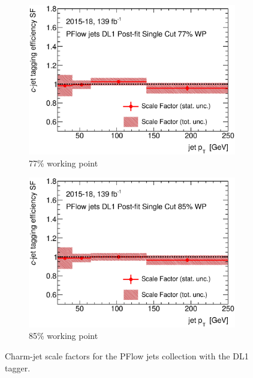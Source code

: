 \begin{figure}[H]
\begin{subfigure}[t]{.35\linewidth}
		\includegraphics[width=1\textwidth]{FTAG_plots/DL1allPFlowDec/SF77.eps}
		\caption{77\% working point}
		\end{subfigure}
		\begin{subfigure}[t]{.35\linewidth}
		\includegraphics[width=1\textwidth]{FTAG_plots/DL1allPFlowDec/SF85.eps}
		\caption{85\% working point}
		\end{subfigure}
	\caption{Charm-jet scale factors for the PFlow jets collection with 
	the DL1 tagger.} \label{fig:Dec_SF_PFlow_DL1}
	\end{figure}
	

